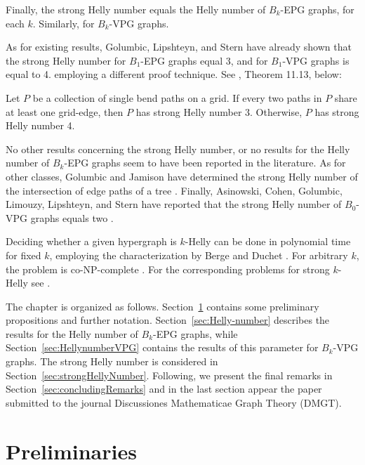 Finally, the strong Helly number equals the Helly number of $B_k$-EPG graphs, for each $k$. Similarly, for $B_k$-VPG graphs. 

As for existing results, 
Golumbic, Lipshteyn, and Stern \cite{golumbic2009}  have already shown that the strong Helly number for $B_1$-EPG graphs equal 3, and for $B_1$-VPG graphs is equal to 4. employing a different proof technique. See  \cite{chung201950}, Theorem 11.13, below:
\begin{theorem}\label{thm:chung201950}{\cite{chung201950}}
Let $P$ be a collection of single bend paths on a grid. If every two paths in $P$ share at least one grid-edge, then $P$ has strong Helly number 3. Otherwise, $P$ has strong Helly number 4.
\end{theorem}
No other results concerning the strong Helly number, or no results for the Helly number of $B_k$-EPG graphs seem to have been reported in the literature. As for other classes, Golumbic and Jamison have determined the strong Helly number of the intersection of edge paths of a tree \cite{golumbic1985}. Finally, Asinowski, Cohen, Golumbic, Limouzy, Lipshteyn, and Stern have reported that the strong Helly number of $B_0$-VPG graphs equals two \cite{asinowski2011string}.  

Deciding whether a given hypergraph is $k$-Helly can be done in polynomial time for fixed $k$, employing the characterization by Berge and Duchet \cite{bergeDuchet1975}. For arbitrary $k$, the problem is co-NP-complete \cite{dourado2009}. For the corresponding problems for strong $k$-Helly see \cite{dourado2008strong,dourado2009}.

The chapter is organized as follows. Section~\ref{sec:preliminares4} contains some preliminary propositions and further notation. Section~\ref{sec:Helly-number} describes the results for the Helly number of $B_k$-EPG graphs, while Section~\ref{sec:HellynumberVPG} contains the results of this parameter for $B_k$-VPG graphs. The strong Helly number is considered in Section~\ref{sec:strongHellyNumber}. Following, we present the final remarks in Section~\ref{sec:concludingRemarks} and in the last section appear the paper submitted to the journal Discussiones Mathematicae Graph Theory (DMGT).




\section{Preliminaries}\label{sec:preliminares4}

